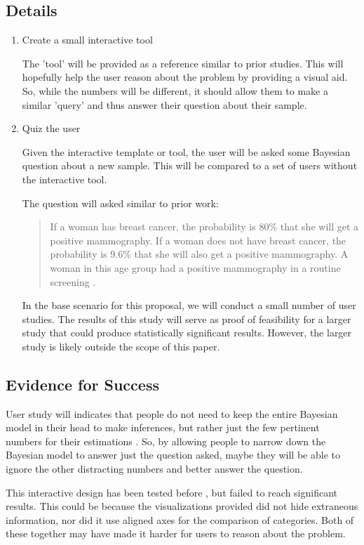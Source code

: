 \documentclass{proc}
\begin{document}
\subsection{Details}
\begin{enumerate}
\item Create a small interactive tool

The 'tool' will be provided as a reference similar to prior studies. This will hopefully help the user reason
about the problem by providing a visual aid. So, while the numbers will be different, it should allow them to 
make a similar 'query' and thus answer their question about their sample. 

\item Quiz the user

Given the interactive template or tool, the user will be asked some Bayesian question about a new sample. 
This will be compared to a set of users without the interactive tool. 

The question will asked similar to prior work: 
\begin{quote}
    If a woman has breast cancer, the
    probability is 80\% that she will get a positive mammography. If a woman
    does not have breast cancer, the probability is 9.6\% that she will also
    get a positive mammography. A woman in this age group had a positive
    mammography in a routine screening \cite{Gigerenzer1995}.
\end{quote}
In the base scenario for this proposal, we will conduct a small number of user studies. The results of this study will serve as proof of feasibility for a larger study that could produce statistically significant results. However, the larger study is likely outside the scope of this paper.
\end{enumerate}


\subsection{Evidence for Success}

User study will indicates that people do not need to keep the entire Bayesian model in their head to make inferences, but 
rather just the few pertinent numbers for their estimations \cite{Gigerenzer1995}. So, by allowing people
to narrow down the Bayesian model to answer just the question asked, maybe they will be able to ignore the other
distracting numbers and better answer the question. 

This interactive design has been tested before \cite{Tsai2011}, but failed to reach significant results.
This could be because the visualizations provided did not hide extraneous information, nor did it use aligned axes
for the comparison of categories. Both of these together may have made it harder for users to reason about the problem. 
\end{document}
